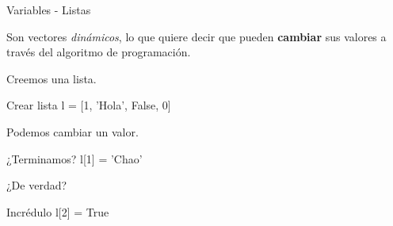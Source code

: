 \begin{frame}[t]{Variables - Listas}\vspace{10pt}

Son vectores \textit{dinámicos}, lo que quiere decir que pueden \textbf{cambiar} sus valores a través del algoritmo de programación.

\vspace{5pt}
Creemos una lista.
\begin{block}{Crear lista}
l = [1, 'Hola', False, 0]
\end{block}

Podemos cambiar un valor.
\begin{block}{¿Terminamos?}
l[1] = 'Chao'
\end{block}

¿De verdad?
\begin{block}{Incrédulo}
l[2] = True
\end{block}

\end{frame}